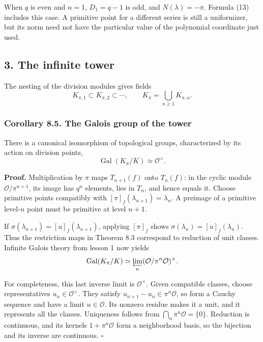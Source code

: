 \documentclass[11pt,a4paper]{article}
\begin{document}
When \(q\) is even and \(n=1\), \(D_1=q-1\) is odd, and
\(N(\lambda)=-\pi\). Formula (13) includes this case. A primitive point
for a different series is still a uniformizer, but its norm need not
have the particular value of the polynomial coordinate just used.

\subsection{3. The infinite tower}\label{the-infinite-tower}

The nesting of the division modules gives fields \[
K_{\pi,1}\subset K_{\pi,2}\subset\cdots,\qquad
K_\pi=\bigcup_{n\geq1}K_{\pi,n}.
\tag{14}
\]

\subsubsection{Corollary 8.5. The Galois group of the
tower}\label{corollary-8.5.-the-galois-group-of-the-tower}

There is a canonical isomorphism of topological groups, characterized by
its action on division points, \[
\operatorname{Gal}(K_\pi/K)\simeq\mathcal O^\times.
\tag{15}
\]

\textbf{Proof.} Multiplication by \(\pi\) maps \(T_{n+1}(f)\) onto
\(T_n(f)\): in the cyclic module \(\mathcal O/\pi^{n+1}\), its image has
\(q^n\) elements, lies in \(T_n\), and hence equals it. Choose primitive
points compatibly with \([\pi]_f(\lambda_{n+1})=\lambda_n\). A preimage
of a primitive level-\(n\) point must be primitive at level \(n+1\).

If \(\sigma(\lambda_{n+1})=[u]_{f}(\lambda_{n+1})\), applying
\([\pi]_f\) shows \(\sigma(\lambda_n)=[u]_f(\lambda_n)\). Thus the
restriction maps in Theorem 8.3 correspond to reduction of unit classes.
Infinite Galois theory from lesson 1 now yields \[
\operatorname{Gal}(K_\pi/K)
 \simeq\varprojlim_n(\mathcal O/\pi^n\mathcal O)^\times.
\]

For completeness, this last inverse limit is \(\mathcal O^\times\).
Given compatible classes, choose representatives
\(u_n\in\mathcal O^\times\). They satisfy
\(u_{n+1}-u_n\in\pi^n\mathcal O\), so form a Cauchy sequence and have a
limit \(u\in\mathcal O\). Its nonzero residue makes it a unit, and it
represents all the classes. Uniqueness follows from
\(\bigcap_n\pi^n\mathcal O=\{0\}\). Reduction is continuous, and its
kernels \(1+\pi^n\mathcal O\) form a neighborhood basis, so the
bijection and its inverse are continuous. \(\square\)
\end{document}
